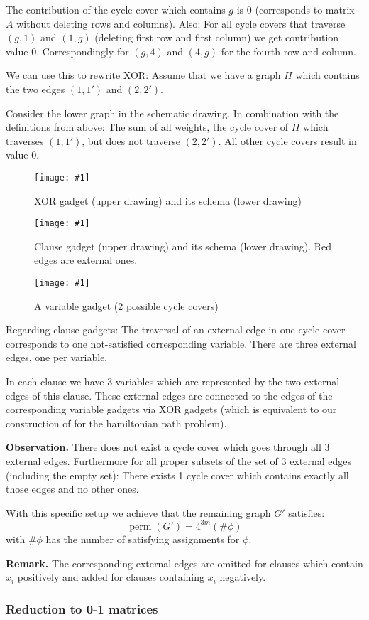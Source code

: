 \documentclass[a4paper]{article}
\newcommand{\pic}[2]{%
 \begin{figure}[ht]
  \begin{center}
   \texttt{[image: \#1]}
   \caption{#2}
  \end{center}
 \end{figure}
}
\begin{document}
The contribution of the cycle cover which contains $g$ is $0$
(corresponds to matrix $A$ without deleting rows and columns).
Also: For all cycle covers that traverse $(g, 1)$ and $(1, g)$
(deleting first row and first column) we get contribution
value $0$. Correspondingly for $(g, 4)$ and $(4, g)$ for the
fourth row and column.

We can use this to rewrite XOR:
Assume that we have a graph $H$ which contains the two edges
$(1, 1')$ and $(2, 2')$.

Consider the lower graph in the schematic drawing.
In combination with the definitions from above:
The sum of all weights, the cycle cover of $H$ which
traverses $(1, 1')$, but does not traverse $(2, 2')$.
All other cycle covers result in value $0$.

\pic{xor_gadget.pdf}{XOR gadget (upper drawing) and its schema (lower drawing)}
\pic{clause_gadget2.pdf}{Clause gadget (upper drawing) and its schema (lower drawing).
  Red edges are external ones.}
\pic{variable_gadget.pdf}{A variable gadget (2 possible cycle covers)}

Regarding clause gadgets:
The traversal of an external edge in one cycle cover corresponds to
one not-satisfied corresponding variable. There are three external
edges, one per variable.

In each clause we have 3 variables which are represented by the two
external edges of this clause. These external edges are connected to
the edges of the corresponding variable gadgets via XOR gadgets
(which is equivalent to our construction of for the hamiltonian path
problem).

\textbf{Observation.}
There does not exist a cycle cover which goes through all 3 external edges.
Furthermore for all proper subsets of the set of 3 external edges
(including the empty set): There exists 1 cycle cover which contains
exactly all those edges and no other ones.

With this specific setup we achieve that the remaining graph $G'$
satisfies:
\[
  \operatorname{perm}(G') = 4^{3m} (\#\phi)
\]
with $\#\phi$ has the number of satisfying assignments for $\phi$.

\textbf{Remark.} The corresponding external edges are omitted for
clauses which contain $x_i$ positively and added for clauses
containing $x_i$ negatively.

\subsubsection{Reduction to 0-1 matrices}
\end{document}
